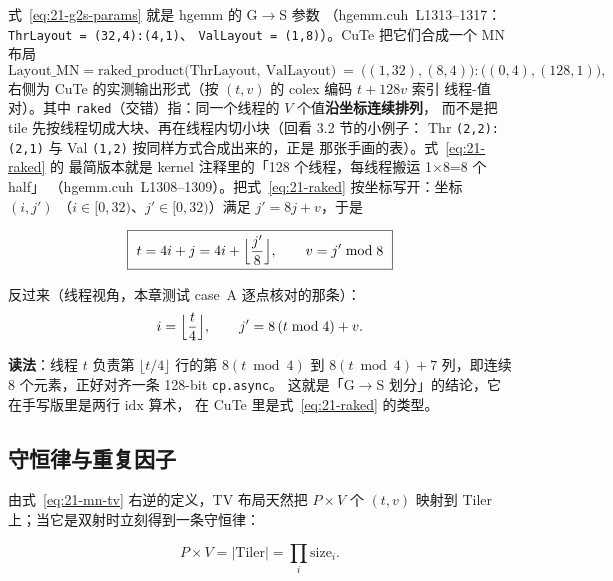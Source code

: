 式~\eqref{eq:21-g2s-params} 就是 hgemm 的 G$\to$S 参数
（hgemm.cuh~L1313--1317：\texttt{Thr\allowbreak{}Layout\ =\allowbreak{}\ \allowbreak{}(32,\allowbreak{}4){:}\allowbreak{}(4,\allowbreak{}1)}、
\texttt{ValLayout\ =\ (1,8)}）。CuTe 把它们合成一个 MN 布局
\begin{equation}
  \mathrm{Layout\_MN} = \mathrm{raked\_product}\bigl(
    \mathrm{ThrLayout},\ \mathrm{ValLayout}\bigr)
  \ =\ \bigl((1,32),(8,4)\bigr){:}\bigl((0,4),(128,1)\bigr),
  \label{eq:21-raked}
\end{equation}
右侧为 CuTe 的实测输出形式（按 $(t,v)$ 的 colex 编码 $t+128v$ 索引
线程-值对）。其中 \texttt{raked}（交错）指：同一个线程的 $V$ 个值\textbf{沿坐标连续排列}，
而不是把 tile 先按线程切成大块、再在线程内切小块（回看 3.2 节的小例子：
Thr \texttt{(2,2):(2,1)} 与 Val \texttt{(1,2)} 按同样方式合成出来的，正是
那张手画的表）。式~\eqref{eq:21-raked} 的
最简版本就是 kernel 注释里的「128 个线程，每线程搬运 1$\times$8=8 个 half」
（hgemm.cuh~L1308--1309）。把式~\eqref{eq:21-raked} 按坐标写开：坐标 $(i,j')$
（$i\in[0,32)$、$j'\in[0,32)$）满足 $j' = 8j+v$，于是

\begin{equation}
  \boxed{\ t = 4i + j = 4i + \Bigl\lfloor \frac{j'}{8}\Bigr\rfloor,
  \qquad v = j' \bmod 8\ }
  \label{eq:21-g2s-mn}
\end{equation}

反过来（线程视角，本章测试 case~A 逐点核对的那条）：
\begin{equation}
  i = \Bigl\lfloor \frac{t}{4}\Bigr\rfloor,\qquad
  j' = 8\,(t \bmod 4) + v .
  \label{eq:21-g2s-tv}
\end{equation}

\textbf{读法}：线程 $t$ 负责第 $\lfloor t/4\rfloor$ 行的第 $8(t\bmod 4)$
到 $8(t\bmod 4)+7$ 列，即连续 8 个元素，正好对齐一条 128-bit \texttt{cp.async}。
这就是「G$\to$S 划分」的结论，它在手写版里是两行 $\mathrm{idx}$ 算术，
在 CuTe 里是式~\eqref{eq:21-raked} 的类型。

\subsection{守恒律与重复因子}

由式~\eqref{eq:21-mn-tv} 右逆的定义，TV 布局天然把
$P\times V$ 个 $(t,v)$ 映射到 Tiler 上；当它是双射时立刻得到一条守恒律：

\begin{equation}
  P \times V = \bigl|\mathrm{Tiler}\bigr| = \prod_i \mathrm{size}_i .
  \label{eq:21-conserve}
\end{equation}

